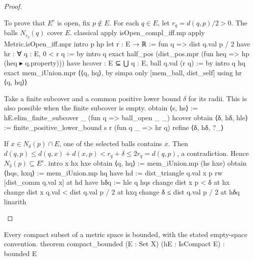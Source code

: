 \begin{proof}
  \begin{lean}{To prove that $E^{c}$ is open, fix $p\notin E$. For each $q\in E$, let $r_q=d(q,p)/2>0$. The balls $N_{r_q}(q)$ cover $E$.}
    classical
    apply isOpen_compl_iff.mp
    apply Metric.isOpen_iff.mpr
    intro p hp
    let r : E → ℝ := fun q => dist q.val p / 2
    have hr : ∀ q : E, 0 < r q := by
      intro q
      exact half_pos (dist_pos.mpr (fun heq => hp (heq ▸ q.property)))
    have hcover : E ⊆ ⋃ q : E, ball q.val (r q) := by
      intro q hq
      exact mem_iUnion.mpr ⟨⟨q, hq⟩, by simpa only [mem_ball, dist_self] using hr ⟨q, hq⟩⟩
  \end{lean}

  \begin{lean}{Take a finite subcover and a common positive lower bound $\delta$ for its radii. This is also possible when the finite subcover is empty.}
    obtain ⟨s, hs⟩ := hE.elim_finite_subcover _ (fun q => ball_open _ _) hcover
    obtain ⟨δ, hδ, hle⟩ := finite_positive_lower_bound s r (fun q _ => hr q)
    refine ⟨δ, hδ, ?_⟩
  \end{lean}

  \begin{lean}{If $x\in N_\delta(p)\cap E$, one of the selected balls contains $x$. Then $d(q,p)\leq d(q,x)+d(x,p)<r_q+\delta\leq 2r_q=d(q,p)$, a contradiction. Hence $N_\delta(p)\subseteq E^{c}$.}
    intro x hx hxe
    obtain ⟨q, hq⟩ := mem_iUnion.mp (hs hxe)
    obtain ⟨hqs, hxq⟩ := mem_iUnion.mp hq
    have hd := dist_triangle q.val x p
    rw [dist_comm q.val x] at hd
    have hδq := hle q hqs
    change dist x p < δ at hx
    change dist x q.val < dist q.val p / 2 at hxq
    change δ ≤ dist q.val p / 2 at hδq
    linarith
  \end{lean}

\end{proof}

\begin{proposition} \label{an1:thm:compact-set-is-bounded}
  \begin{lean}{Every compact subset of a metric space is bounded, with the stated empty-space convention.}
    theorem compact_bounded (E : Set X) (hE : IsCompact E) : bounded E
  \end{lean}
\end{proposition}

